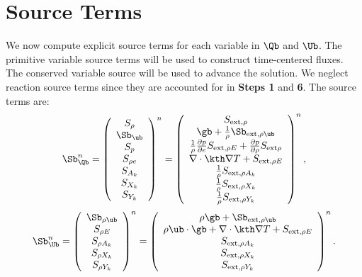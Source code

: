 \section{Source Terms}

We now compute explicit source terms for each variable in $\Qb$ and
$\Ub$.  The primitive variable source terms will be used to construct
time-centered fluxes.  The conserved variable source will be used to
advance the solution.  We neglect reaction source terms since they are
accounted for in {\bf Steps 1} and {\bf 6}.  The source terms are:
\begin{equation}
\Sb_{\Qb}^n =
\left(\begin{array}{c}
S_\rho \\
\Sb_{\ub} \\
S_p \\
S_{\rho e} \\
S_{A_k} \\
S_{X_k} \\
S_{Y_k}
\end{array}\right)^n
=
\left(\begin{array}{c}
S_{{\rm ext},\rho} \\
\gb + \frac{1}{\rho}\Sb_{{\rm ext},\rho\ub} \\
\frac{1}{\rho}\frac{\partial p}{\partial e}S_{{\rm ext},\rho E} + \frac{\partial p}{\partial\rho}S_{{\rm ext}\rho} \\
\nabla\cdot\kth\nabla T + S_{{\rm ext},\rho E} \\
\frac{1}{\rho}S_{{\rm ext},\rho A_k} \\
\frac{1}{\rho}S_{{\rm ext},\rho X_k} \\
\frac{1}{\rho}S_{{\rm ext},\rho Y_k}
\end{array}\right)^n,
\end{equation}
\begin{equation}
\Sb_{\Ub}^n =
\left(\begin{array}{c}
\Sb_{\rho\ub} \\
S_{\rho E} \\
S_{\rho A_k} \\
S_{\rho X_k} \\
S_{\rho Y_k}
\end{array}\right)^n
=
\left(\begin{array}{c}
\rho \gb + \Sb_{{\rm ext},\rho\ub} \\
\rho \ub \cdot \gb + \nabla\cdot\kth\nabla T + S_{{\rm ext},\rho E} \\
S_{{\rm ext},\rho A_k} \\
S_{{\rm ext},\rho X_k} \\
S_{{\rm ext},\rho Y_k}
\end{array}\right)^n.
\end{equation}


